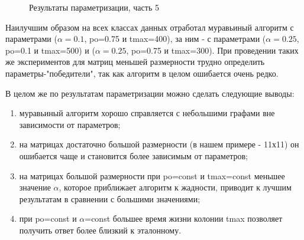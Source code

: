 \clearpage
\begin{figure}[h!]
	
	
	\caption{Результаты параметризации, часть 5}
	
	\label{fig:tab5}
	
\end{figure}

Наилучшим образом на всех классах данных отработал муравьиный алгоритм с параметрами ($\alpha=0.1$, po=0.75 и tmax=400), за ним - с параметрами ($\alpha=0.25$, po=0.1 и tmax=500) и ($\alpha=0.25$, po=0.75 и tmax=300). При проведении таких же экспериментов для матриц меньшей размерности трудно определить параметры-"победители", так как алгоритм в целом ошибается очень редко.

 В целом же по результатам параметризации можно сделать следующие выводы:
 \begin{enumerate}[label={\arabic*)}]
 	\item муравьиный алгоритм хорошо справляется с небольшими графами вне зависимости от параметров;
 	\item на матрицах достаточно большой размерности (в нашем примере - 11х11) он ошибается чаще и становится более зависимым от параметров;
 	\item на матрицах большой размерности при po=const и tmax=const меньшее значение $\alpha$, которое приближает алгоритм к жадности, приводит к лучшим результатам в сравнении с большими значениями;
 	\item при po=const и $\alpha$=const большее время жизни колонии tmax позволяет получить ответ более близкий к эталонному.
 \end{enumerate}
 


